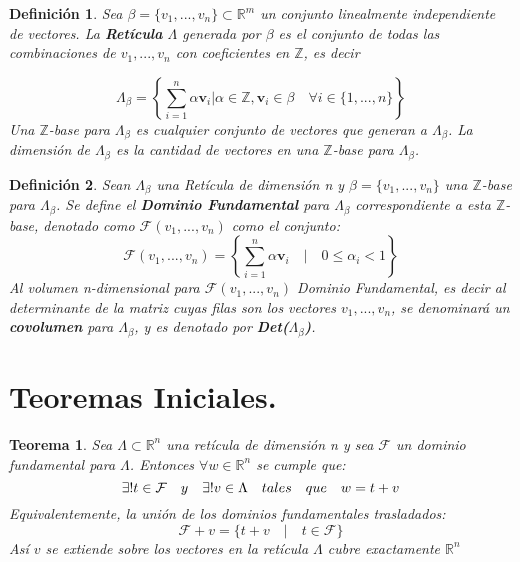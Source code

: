 \documentclass[12pt]{report}
\newtheorem{defi}{Definición}
\newtheorem{teo}{Teorema}
\begin{document}
\begin{defi}
Sea $\beta = \{ {v}_{1}, ..., {v}_{n} \}\subset{\mathbb R}^{m}$ un conjunto linealmente independiente de vectores. La \textbf{Retícula} $\Lambda$ generada por $\beta$ es el conjunto de todas las combinaciones de ${v}_{1}, ..., {v}_{n}$ con coeficientes en $\mathbb{Z}$, es decir

\[ \Lambda_{\beta} = \left\{ \sum _{{i=1}}^{{n}}\alpha{\mathbf  {v}}_{i} | \alpha \in \mathbb{Z},{\mathbf  {v}}_{i}\in \beta  \quad \forall i \in \{1,..., n\} \right\} \] 
Una $\mathbb{Z}$-base para $\Lambda_{\beta}$ es cualquier conjunto de vectores que generan a $\Lambda_{\beta}$. La \textit{dimensión} de $\Lambda_{\beta}$ es la cantidad de vectores en una $\mathbb{Z}$-base para $\Lambda_{\beta}$.
\end{defi}

\begin{defi}
	Sean $\Lambda_{\beta}$ una Retícula de dimensión n y $\beta = \{ {v}_{1}, ..., {v}_{n} \}$ una $\mathbb{Z}$-base para $\Lambda_{\beta}$. Se define el \textbf{Dominio Fundamental} para $\Lambda_{\beta}$ correspondiente a esta $\mathbb{Z}$-base, denotado como $\mathcal{F}({v}_{1}, ..., {v}_{n})$ como el conjunto: 
\[\mathcal{F}({v}_{1}, ..., {v}_{n}) = \left\{ \sum _{{i=1}}^{{n}}\alpha{\mathbf  {v}}_{i}\quad | \quad 0 \leq \alpha_{i} < 1 \right\} \] 
	Al volumen n-dimensional para $\mathcal{F}({v}_{1}, ..., {v}_{n})$ Dominio Fundamental, es decir al determinante de la matriz cuyas filas son los vectores ${v}_{1}, ..., {v}_{n}$, se denominará un \textbf{covolumen} para $\Lambda_{\beta}$, y es denotado por \textbf{Det($\Lambda_{\beta}$)}.
\end{defi}

\section{Teoremas Iniciales.}

\begin{teo}
    Sea $\Lambda\subset{\mathbb{R}}^{n}$ una retícula de dimensión n y sea $\mathcal{F}$ un dominio fundamental para $\Lambda$. Entonces $\forall w \in{\mathbb{R}}^{n}$ se cumple que: 
    \begin{equation}
        \centering
\exists!t\in\mathcal{F} \quad y \quad \exists!v\in\Lambda \quad tales \quad que \quad w = t + v
    \end{equation}
    Equivalentemente, la unión de los dominios fundamentales trasladados:
    \[\mathcal{F} + v = \{t + v \quad | \quad t \in \mathcal{F} \} \] 
    Así $v$ se extiende sobre los vectores en la retícula $\Lambda$ cubre exactamente $\mathbb{R}^{n}$
\end{teo}
\end{document}
